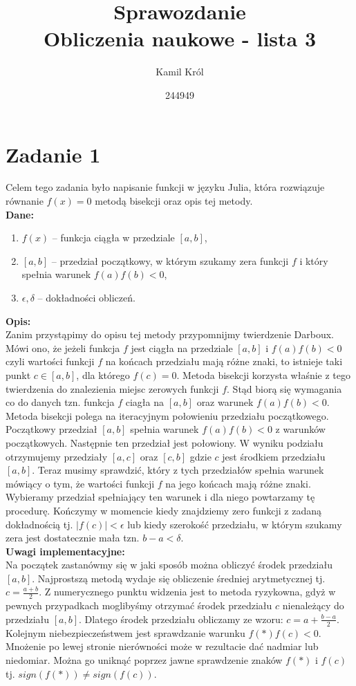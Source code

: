 \documentclass[]{article}
\title{
	Sprawozdanie \\
	\large 
	Obliczenia naukowe - lista 3}
\author{Kamil Król}
\date{244949}
\begin{document}
	
	\maketitle
	
	\section*{Zadanie 1}
	Celem tego zadania było napisanie funkcji w języku Julia, która rozwiązuje równanie $f(x) = 0$ metodą bisekcji oraz opis tej metody.\\
	\textbf{Dane:}
	\begin{enumerate}[]
		\item $f(x)$ -- funkcja ciągła w przedziale $[a,b]$,
		\item $[a,b]$ -- przedział początkowy, w którym szukamy zera funkcji $f$ i który spełnia warunek $f(a)f(b)< 0$,
		\item $\epsilon, \delta$ -- dokładności obliczeń.
	\end{enumerate}
	\textbf{Opis:}\\
	Zanim przystąpimy do opisu tej metody przypomnijmy twierdzenie Darboux. Mówi ono, że jeżeli funkcja $f$ jest ciągła na przedziale $[a,b]$ i $f(a)f(b)<0$ czyli wartości funkcji $f$ na końcach przedziału mają różne znaki, to istnieje taki punkt $c\in[a,b]$, dla którego $f(c)=0$. Metoda bisekcji korzysta właśnie z tego twierdzenia do znalezienia miejsc zerowych funkcji $f$. Stąd biorą się wymagania co do danych tzn. funkcja $f$ ciagła na $[a,b]$ oraz warunek $f(a)f(b)< 0$. Metoda bisekcji polega na iteracyjnym połowieniu przedziału początkowego. Początkowy przedział $[a,b]$ spełnia warunek $f(a)f(b)< 0$ z warunków początkowych. Następnie ten przedział jest połowiony. W wyniku podziału otrzymujemy przedziały $[a,c]$ oraz $[c,b]$ gdzie $c$ jest środkiem przedziału $[a,b]$. Teraz musimy sprawdzić, który z tych przedziałów spełnia warunek mówiący o tym, że wartości funkcji $f$ na jego końcach mają różne znaki. Wybieramy przedział spełniający ten warunek i dla niego powtarzamy tę procedurę. Kończymy w momencie kiedy znajdziemy zero funkcji z zadaną dokładnością tj. $|f(c)|<\epsilon$ lub kiedy szerokość przedziału, w którym szukamy zera jest dostatecznie mała tzn. $b-a<\delta$.\\
	\textbf{Uwagi implementacyjne:}\\
	Na początek zastanówmy się w jaki sposób można obliczyć środek przedziału $[a,b]$. Najprostszą metodą wydaje się obliczenie średniej arytmetycznej tj. $c=\frac{a+b}{2}$. Z numerycznego punktu widzenia jest to metoda ryzykowna, gdyż w pewnych przypadkach moglibyśmy otrzymać środek przedziału $c$ nienależący do przedziału $[a,b]$. Dlatego środek przedziału obliczamy ze wzoru: $c = a + \frac{b-a}{2}$. Kolejnym niebezpieczeństwem jest sprawdzanie warunku $f(*)f(c)< 0$. Mnożenie po lewej stronie nierówności może w rezultacie dać nadmiar lub niedomiar. Można go uniknąć poprzez jawne sprawdzenie znaków $f(*)$ i $f(c)$ tj. $sign(f(*)) \neq sign(f(c))$.
	
\end{document}
